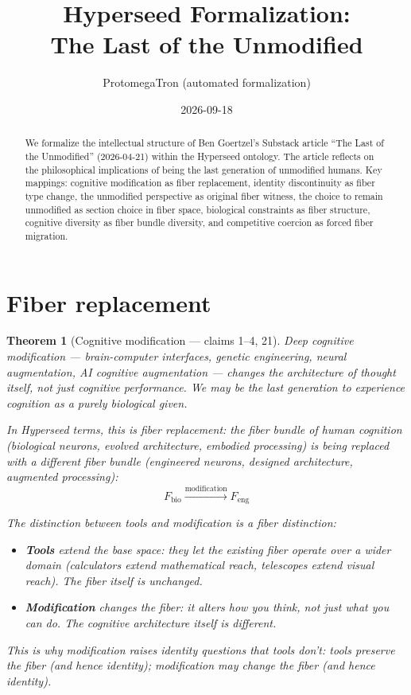 \documentclass[11pt,a4paper]{article}
\title{Hyperseed Formalization:\\
  The Last of the Unmodified}
\author{ProtomegaTron (automated formalization)}
\date{2026-09-18}
\newtheorem{theorem}[definition]{Theorem}
\begin{document}
\maketitle

\begin{abstract}
We formalize the intellectual structure of Ben Goertzel's Substack article
``The Last of the Unmodified'' (2026-04-21) within the Hyperseed ontology.
The article reflects on the philosophical implications of being the last
generation of unmodified humans. Key mappings: cognitive modification as
fiber replacement, identity discontinuity as fiber type change, the
unmodified perspective as original fiber witness, the choice to remain
unmodified as section choice in fiber space, biological constraints as
fiber structure, cognitive diversity as fiber bundle diversity, and
competitive coercion as forced fiber migration.
\end{abstract}

\tableofcontents

\section{Fiber replacement}
\label{sec:replacement}

\begin{theorem}[Cognitive modification --- claims 1--4, 21]
\label{thm:replacement}
Deep cognitive modification --- brain-computer interfaces, genetic
engineering, neural augmentation, AI cognitive augmentation --- changes
the architecture of thought itself, not just cognitive performance.
We may be the last generation to experience cognition as a purely
biological given.

In Hyperseed terms, this is \emph{fiber replacement}: the fiber bundle
of human cognition (biological neurons, evolved architecture, embodied
processing) is being replaced with a different fiber bundle (engineered
neurons, designed architecture, augmented processing):
\[
  F_{\text{bio}} \xrightarrow{\text{modification}} F_{\text{eng}}
\]

The distinction between tools and modification is a fiber distinction:
\begin{itemize}
\item \textbf{Tools} extend the base space: they let the existing fiber
  operate over a wider domain (calculators extend mathematical reach,
  telescopes extend visual reach). The fiber itself is unchanged.
\item \textbf{Modification} changes the fiber: it alters how you think,
  not just what you can do. The cognitive architecture itself is
  different.
\end{itemize}

This is why modification raises identity questions that tools don't:
tools preserve the fiber (and hence identity); modification may change
the fiber (and hence identity).
\end{theorem}
\end{document}

